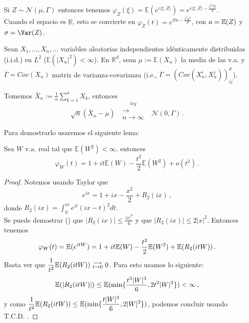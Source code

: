 \begin{remark}
Si $Z\sim\mathcal{N}(\mu,\Gamma)$ entonces tenemos $\varphi_Z(\xi)=\mathbb{E}(e^{i\langle\xi,Z\rangle})=e^{i\langle\xi,Z\rangle-\frac{\xi^T\Gamma\xi}{Z}}$.
\\ Cuando el espacio es $\mathbb{R}$, esto se convierte en $\varphi_Z(t)=e^{ita-\frac{t^2\sigma^2}{Z}}$, con $a=\mathbb{E}(Z)$ y $\sigma=\Var(Z)$.
\end{remark}

\begin{theorem}[T.C.L. multivariado]
\label{tcl}
Sean $X_1,\dots,X_n,\dots$ variables aleatorias independientes idénticamente distribuidas (i.i.d.) en $L^2$ %
($\mathbb{E}(|X_n|^2)<\infty$). En $\mathbb{R}^d$, sean $\mu:=\mathbb{E}(X_n)$ 
la media de las v.a. y $\Gamma=Cov(X_n)$ matriz de varianza-covarianza (i.e., $\Gamma=(Cov(X_n^i,X_n^j))_{ij}^d$). 

Tomemos $\bar{X}_n:=\displaystyle\frac{1}{n} \sum^n_{k=1}X_k$, entonces
$$ \sqrt{n}(\bar{X}_n-\mu)\mbox{ }\overset{ley}{\substack{\longrightarrow \\n \to \infty}}\mbox{ }\mathcal{N}(0,\Gamma) \, .$$
\end{theorem}
Para demostrarlo usaremos el siguiente lema:
\begin{lemma}
\label{lemma:lema_tcl}
Sea $W$ v.a. real tal que $\mathbb{E}(W^2)<\infty$, entonces $$\varphi_W(t)=1+it\mathbb{E}(W)-\frac{t^2}{2}\mathbb{E}(W^2)+o(t^2) \, .$$
\end{lemma}
\begin{proof}
\gris Notemos usando Taylor que
$$ e^{ix} = \displaystyle 1+ix-\frac{x^2}{2} + R_2(ix) \, ,$$
donde $R_2(ix) = \displaystyle\int_0^{ix}e^{it}(ix-t)^2dt$. 
\\ Se puede demostrar (\ejercicio\gris) que $|R_2(ix)|\leq \frac{|x|^3}{6}$ y que $|R_2(ix)|\leq 2|x|^2$. Entonces tenemos
$$ \varphi_W(t)=\displaystyle\mathbb{E}(e^{itW})=1+it\mathbb{E}(W)-\frac{t^2}{2}\mathbb{E}(W^2)+\mathbb{E}(R_2(itW)) \, .$$
Basta ver que $\displaystyle\frac{1}{t^2}\mathbb{E}(R_2(itW)) \mbox{ }\overset{}{\substack{\longrightarrow \\t \to 0}}\mbox{ }0$. Para esto usamos lo siguiente:
$$\displaystyle \mathbb{E}(|R_2(itW)|) \leq \mathbb{E}(\min\{\frac{t^3|W|^3}{6},2t^2|W|^2\})<\infty \, ,$$ 
y como $\displaystyle\frac{1}{t^2}\mathbb{E}(R_2(itW))\leq \mathbb{E}(\min\{\frac{t|W|^3}{6},2|W|^2\}) $, podemos concluir usando T.C.D. . \findem
\end{proof}

